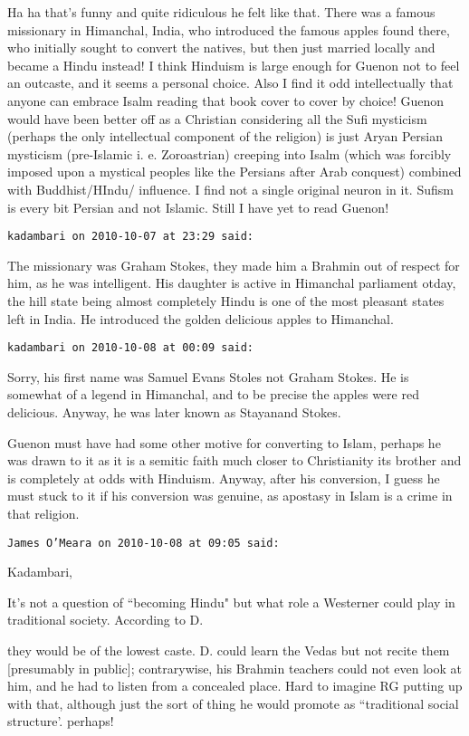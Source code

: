 \begin{footnotesize}
\begin{sffamily}
Ha ha that's funny and quite ridiculous he felt like that. There was a famous missionary in Himanchal, India, who introduced the famous apples found there, who initially sought to convert the natives, but then just married locally and became a Hindu instead! I think Hinduism is large enough for Guenon not to feel an outcaste, and it seems a personal choice. Also I find it odd intellectually that anyone can embrace Isalm reading that book cover to cover by choice! Guenon would have been better off as a Christian considering all the Sufi mysticism (perhaps the only intellectual component of the religion) is just Aryan Persian mysticism (pre-Islamic i. e. Zoroastrian) creeping into Isalm (which was forcibly imposed upon a mystical peoples like the Persians after Arab conquest) combined with Buddhist/HIndu/ influence. I find not a single original neuron in it. Sufism is every bit Persian and not Islamic. Still I have yet to read Guenon!


\hfill

\texttt{kadambari on 2010-10-07 at 23:29 said: }

The missionary was Graham Stokes, they made him a Brahmin out of respect for him, as he was intelligent. His daughter is active in Himanchal parliament otday, the hill state being almost completely Hindu is one of the most pleasant states left in India. He introduced the golden delicious apples to Himanchal.


\hfill

\texttt{kadambari on 2010-10-08 at 00:09 said: }

Sorry, his first name was Samuel Evans Stoles not Graham Stokes. He is somewhat of a legend in Himanchal, and to be precise the apples were red delicious. Anyway, he was later known as Stayanand Stokes.

Guenon must have had some other motive for converting to Islam, perhaps he was drawn to it as it is a semitic faith much closer to Christianity its brother and is completely at odds with Hinduism. Anyway, after his conversion, I guess he must stuck to it if his conversion was genuine, as apostasy in Islam is a crime in that religion.


\hfill

\texttt{James O'Meara on 2010-10-08 at 09:05 said: }

Kadambari,

It's not a question of ``becoming Hindu" but what role a Westerner could play in traditional society. According to D.

they would be of the lowest caste. D. could learn the Vedas but not recite them [presumably in public]; contrarywise, his Brahmin teachers could not even look at him, and he had to listen from a concealed place. Hard to imagine RG putting up with that, although just the sort of thing he would promote as ``traditional social structure'. perhaps!


\end{sffamily}
\end{footnotesize}
